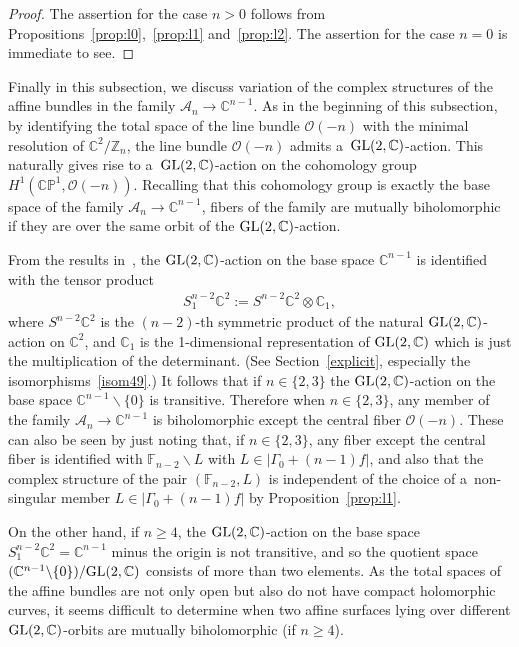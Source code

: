 \documentclass[11pt]{article}
\numberwithin{equation}{section}
\begin{document}
\begin{proof}
The assertion for the case $n>0$ follows from Propositions~\ref{prop:l0},~\ref{prop:l1} and~\ref{prop:l2}.
The assertion for the case $n=0$ is immediate to see.
\end{proof}

Finally in this subsection, we discuss variation of the complex structures of the af\/f\/ine bundles in the family
$\mathscr A_n\to\mathbb{C}^{n-1}$.
As in the beginning of this subsection, by identifying the total space of the line bundle $\mathscr O(-n)$ with the
minimal resolution of $\mathbb{C}^2/\mathbb{Z}_n$, the line bundle $\mathscr O(-n)$ admits
a~${\rm{GL}}(2,\mathbb{C})$-action.
This naturally gives rise to a~${\rm{GL}}(2,\mathbb{C})$-action on the cohomology group $H^1(\mathbb{CP}^1,\mathscr
O(-n))$.
Recalling that this cohomology group is exactly the base space of the family $\mathscr A_n\to\mathbb{C}^{n-1}$, f\/ibers
of the family are mutually biholomorphic if they are over the same orbit of the ${\rm{GL}}(2,\mathbb{C})$-action.

From the results in~\cite{HonCMP2}, the ${\rm{GL}}(2,\mathbb{C})$-action on the base space $\mathbb{C}^{n-1}$ is
identif\/ied with the tensor product
\begin{gather*}
S_1^{n-2}\mathbb{C}^2:=S^{n-2}\mathbb{C}^2\otimes\mathbb{C}_1,
\end{gather*}
where $S^{n-2}\mathbb{C}^2$ is the $(n-2)$-th symmetric product of the natural ${\rm{GL}}(2,\mathbb{C})$-action on
$\mathbb{C}^2$, and $\mathbb{C}_1$ is the 1-dimensional representation of ${\rm{GL}}(2,\mathbb{C})$ which is just the
multiplication of the determinant.
(See Section~\ref{explicit}, especially the isomorphisms~\eqref{isom49}.) It follows that if $n\in\{2,3\}$ the
${\rm{GL}}(2,\mathbb{C})$-action on the base space $\mathbb{C}^{n-1}\backslash\{0\}$ is transitive.
Therefore when $n\in\{2,3\}$, any member of the family $\mathscr A_n\to\mathbb{C}^{n-1}$ is biholomorphic except the
central f\/iber $\mathscr O(-n)$.
These can also be seen by just noting that, if $n\in\{2,3\}$, any f\/iber except the central f\/iber is identif\/ied
with $\mathbb{F}_{n-2}\backslash L$ with $L\in |\Gamma_0+(n-1)f|$, and also that the complex structure of the pair
$(\mathbb{F}_{n-2},L)$ is independent of the choice of a~non-singular member $L\in|\Gamma_0+(n-1)f|$ by
Proposition~\ref{prop:l1}.

On the other hand, if $n\ge 4$, the ${\rm{GL}}(2,\mathbb{C})$-action on the base space
$S_1^{n-2}\mathbb{C}^2=\mathbb{C}^{n-1}$ minus the origin is not transitive, and so the quotient space
$(\mathbb{C}^{n-1}\backslash\{0\})/{\rm{GL}}(2,\mathbb{C})$ consists of more than two elements.
As the total spaces of the af\/f\/ine bundles are not only open but also do not have compact holomorphic curves, it
seems dif\/f\/icult to determine when two af\/f\/ine surfaces lying over dif\/ferent ${\rm{GL}}(2,\mathbb{C})$-orbits
are mutually biholomorphic (if $n\ge 4$).
\end{document}
